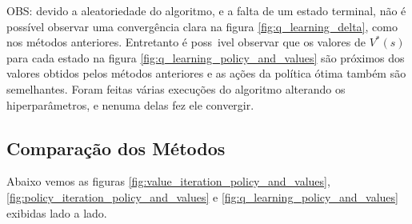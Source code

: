 OBS: devido a aleatoriedade do algoritmo, e a falta de um estado terminal, não é possível observar uma convergência clara na figura \ref{fig:q_learning_delta}, como nos métodos anteriores. Entretanto é poss~ivel observar que os valores de \( V^* (s) \) para cada estado na figura \ref{fig:q_learning_policy_and_values} são próximos dos valores obtidos pelos métodos anteriores e as ações da política ótima também são semelhantes. Foram feitas várias execuções do algoritmo alterando os hiperparâmetros, e nenuma delas fez ele convergir.

\subsection*{Comparação dos Métodos}

Abaixo vemos as figuras \ref{fig:value_iteration_policy_and_values}, \ref{fig:policy_iteration_policy_and_values} e \ref{fig:q_learning_policy_and_values} exibidas lado a lado.

